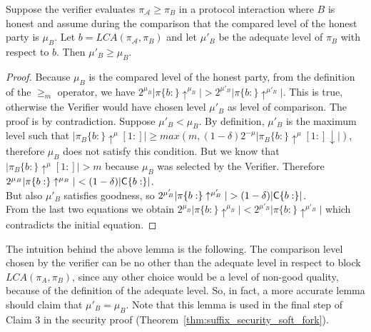 \begin{lemma}
	Suppose the verifier evaluates $\pi_\mathcal{A} \geq \pi_B$ in a
	protocol interaction where $B$ is honest and assume during the comparison that the
	compared level of the honest party is $\mu_B$. Let $b = LCA(\pi_\mathcal{A}, \pi_B)$ and
	let ${\mu}'_B$ be the adequate level of $\pi_B$ with respect to $b$. Then ${\mu}'_B
	\geq \mu_B$.
	\label{lemm:greatest_adequate}
\end{lemma}
\begin{proof}
	Because $\mu_B$ is the compared level of the honest party, from
	the definition of the $\geq_m$ operator, we have $2^{\mu_B} \vert \pi\{b:\}\uparrow^{\mu_B}
	\vert > 2^{{\mu}'_B} \vert \pi\{b:\}\uparrow^{{\mu}'_B} \vert $. This is true,
	otherwise the Verifier would have chosen level $\mu'_B$ as level of comparison.
	The proof is by contradiction. Suppose $\mu'_B < \mu_B$.
	By definition, $\mu'_B$ is the maximum level such that $\vert \pi_B\{b:\}\uparrow^\mu
	[1:] \vert \geq max(m, (1-\delta)2^{-\mu}\vert \pi_B\{b:\}\uparrow^\mu [1:]\downarrow
	\vert)$, therefore $\mu_B$ does not satisfy this condition.
	But we know that $\vert \pi_B\{b:\}\uparrow^\mu [1:] \vert > m$ because
	$\mu_B$ was selected by the Verifier.
	Therefore $ 2^{\mu_B} \vert \pi\{b:\}\uparrow^{\mu_B} \vert < (1-\delta)\vert
	\mathsf{C}\{b:\}\vert $. \\
	But also $\mu'_B$ satisfies goodness, so $ 2^{\mu'_B} \vert \pi\{b:\}\uparrow^{\mu'_B}
	\vert > (1-\delta)\vert \mathsf{C}\{b:\}\vert $.\\ From the last two equations we obtain
	$ 2^{\mu_B} \vert \pi\{b:\}\uparrow^{\mu_B} \vert < 2^{\mu'_B} \vert
	\pi\{b:\}\uparrow^{\mu'_B} \vert$ which contradicts the initial equation.
\end{proof}

The intuition behind the above lemma is the following. The comparison level chosen by the verifier can be
no other than the adequate level in respect to block $LCA(\pi_A, \pi_B)$, since
any other choice would be a level of non-good quality, because of the definition of
the adequate level. 
So, in fact, a more accurate lemma should claim that $\mu'_B = \mu_B$. 
Note that this lemma is used in the final step of Claim 3 in the security proof (Theorem~\ref{thm:suffix_security_soft_fork}).

